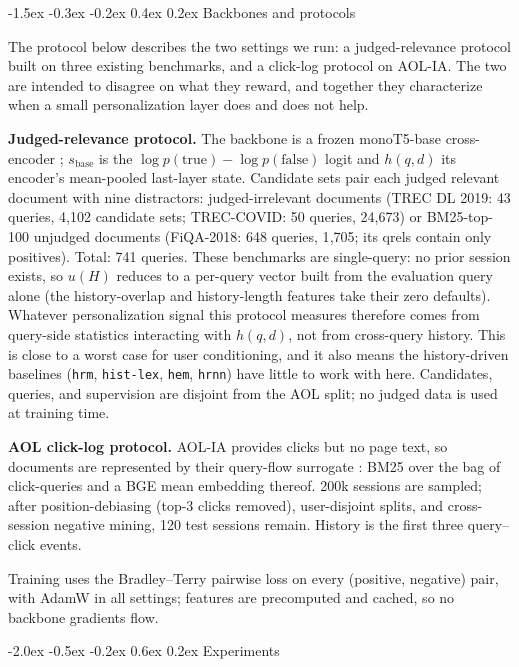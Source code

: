 \documentclass{article}
\makeatletter
\renewcommand{\section}{\@startsection {section}{1}{\z@}
  {-2.0ex \@plus -0.5ex \@minus -0.2ex}
  {0.6ex \@plus 0.2ex}
  {\normalfont\large\bfseries\centering}}
\renewcommand{\subsection}{\@startsection{subsection}{2}{\z@}
  {-1.5ex \@plus -0.3ex \@minus -0.2ex}
  {0.4ex \@plus 0.2ex}
  {\normalfont\normalsize\bfseries}}
\makeatother
\begin{document}
\subsection{Backbones and protocols}
\label{ssec:backbone}

The protocol below describes the two settings we run: a judged-relevance
protocol built on three existing benchmarks, and a click-log protocol
on AOL-IA. The two are intended to disagree on what they reward, and
together they characterize when a small personalization layer does and
does not help.

\textbf{Judged-relevance protocol.} The backbone is a frozen
monoT5-base cross-encoder \cite{nogueira2020monot5}; $s_{\mathrm{base}}$
is the $\log p(\text{true})-\log p(\text{false})$ logit and $h(q,d)$ its
encoder's mean-pooled last-layer state. Candidate sets pair each judged
relevant document with nine distractors: judged-irrelevant documents
(TREC DL 2019: 43 queries, 4{,}102 candidate sets; TREC-COVID: 50
queries, 24{,}673) or BM25-top-100 unjudged documents (FiQA-2018: 648
queries, 1{,}705; its qrels contain only positives). Total: 741 queries.
These benchmarks are single-query: no prior session exists, so
$u(H)$ reduces to a per-query vector built from the evaluation
query alone (the history-overlap and history-length features take
their zero defaults). Whatever personalization signal this protocol
measures therefore comes from query-side statistics interacting with
$h(q,d)$, not from cross-query history. This is close to a worst case
for user conditioning, and it also means the history-driven baselines
(\texttt{hrm}, \texttt{hist-lex}, \texttt{hem}, \texttt{hrnn}) have
little to work with here. Candidates, queries, and supervision are
disjoint from the AOL split; no judged data is used at training time.

\textbf{AOL click-log protocol.} AOL-IA provides clicks but no page
text, so documents are represented by their query-flow surrogate
\cite{craswell2007click}: BM25 over the bag of click-queries and a BGE
\cite{xiao2023bge} mean embedding thereof. 200k sessions are sampled;
after position-debiasing (top-3 clicks removed), user-disjoint splits,
and cross-session negative mining, 120 test sessions remain. History is
the first three query--click events.

Training uses the Bradley--Terry pairwise loss on every
(positive, negative) pair, with AdamW in all settings; features
are precomputed and cached, so no backbone gradients flow.

\section{Experiments}
\label{sec:experiments}
\end{document}
